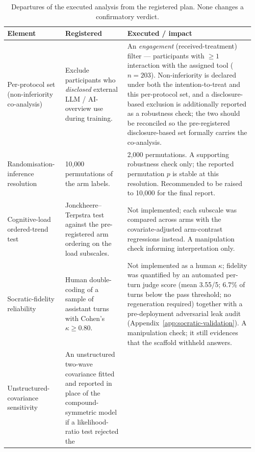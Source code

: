 \begin{table}[htbp]
  \centering
  \caption{Departures of the executed analysis from the registered plan. None
    changes a confirmatory verdict.}
  \label{tab:dev-code}
  \small
  \renewcommand{\arraystretch}{1.25}
  \setlength{\tabcolsep}{4pt}
  \begin{tabular}{p{} p{} p{}}
    \toprule
    Element & Registered & Executed / impact \\
    \midrule
    Per-protocol set (non-inferiority co-analysis)
      & Exclude participants who \emph{disclosed} external LLM / AI-overview use
        during training.
      & An \emph{engagement} (received-treatment) filter --- participants with
        $\geq 1$ interaction with the assigned tool ($n=203$). Non-inferiority
        is declared under both the intention-to-treat and this per-protocol set,
        and a disclosure-based exclusion is additionally reported as a robustness
        check; the two should be reconciled so the pre-registered
        disclosure-based set formally carries the co-analysis. \\
    Randomisation-inference resolution
      & 10{,}000 permutations of the arm labels.
      & 2{,}000 permutations. A supporting robustness check only; the reported
        permutation $p$ is stable at this resolution. Recommended to be raised to
        10{,}000 for the final report. \\
    Cognitive-load ordered-trend test
      & Jonckheere--Terpstra test against the pre-registered arm ordering on the
        load subscales.
      & Not implemented; each subscale was compared across arms with the
        covariate-adjusted arm-contrast regressions instead. A manipulation
        check informing interpretation only. \\
    Socratic-fidelity reliability
      & Human double-coding of a sample of assistant turns with Cohen's $\kappa
        \geq 0.80$.
      & Not implemented as a human $\kappa$; fidelity was quantified by an
        automated per-turn judge score (mean 3.55/5; 6.7\% of turns below the
        pass threshold; no regeneration required) together with a pre-deployment
        adversarial leak audit (Appendix~\ref{app:socratic-validation}). A
        manipulation check; it still evidences that the scaffold withheld
        answers. \\
    Unstructured-covariance sensitivity
      & An unstructured two-wave covariance fitted and reported in place of the
        compound-symmetric model if a likelihood-ratio test rejected the

\end{tabular}
\end{table}
